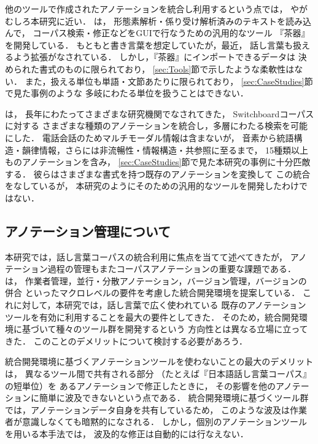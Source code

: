 \documentclass[japanese]{jnlp_1.4}
\begin{document}
他のツールで作成されたアノテーションを統合し利用するという点では，
やがむしろ本研究に近い．
は，
形態素解析・係り受け解析済みのテキストを読み込んで，
コーパス検索・修正などをGUIで行なうための汎用的なツール
『茶器』を開発している．
もともと書き言葉を想定していたが，最近，
話し言葉も扱えるよう拡張がなされている\cite{浅原_2013_コーパ}．
しかし，『茶器』にインポートできるデータは
決められた書式のものに限られており，
\ref{sec:Tools}節で示したような柔軟性はない．
また，扱える単位も単語・文節あたりに限られており，
\ref{sec:CaseStudies}節で見た事例のような
多岐にわたる単位を扱うことはできない．

は，
長年にわたってさまざまな研究機関でなされてきた，
    Switchboardコーパス\cite{Godfrey_1992_STS}に対する
さまざまな種類のアノテーションを統合し，多層にわたる検索を可能にした．
電話会話のためマルチモーダル情報は含まないが，
音素から統語構造・韻律情報，さらには非流暢性・情報構造・共参照に至るまで，
15種類以上ものアノテーションを含み，
\ref{sec:CaseStudies}節で見た本研究の事例に十分匹敵する．
彼らはさまざまな書式を持つ既存のアノテーションを変換して
この統合をなしているが，
本研究のようにそのための汎用的なツールを開発したわけではない．


\subsection{アノテーション管理について}

本研究では，話し言葉コーパスの統合利用に焦点を当てて述べてきたが，
アノテーション過程の管理もまたコーパスアノテーションの重要な課題である．
は，
作業者管理，並行・分散アノテーション，バージョン管理，バージョンの併合
といったマクロレベルの要件を考慮した統合開発環境を提案している．
これに対して，本研究では，話し言葉で広く使われている
既存のアノテーションツールを有効に利用することを最大の要件としてきた．
そのため，統合開発環境に基づいて種々のツール群を開発するという
方向性とは異なる立場に立ってきた．
このことのデメリットについて検討する必要があろう．

統合開発環境に基づくアノテーションツールを使わないことの最大のデメリットは，
異なるツール間で共有される部分
（たとえば『日本語話し言葉コーパス』の短単位）を
あるアノテーションで修正したときに，
その影響を他のアノテーションに簡単に波及できないという点である．
統合開発環境に基づくツール群では，アノテーションデータ自身を共有しているため，
このような波及は作業者が意識しなくても暗黙的になされる．
しかし，個別のアノテーションツールを用いる本手法では，
波及的な修正は自動的には行なえない．
\end{document}
